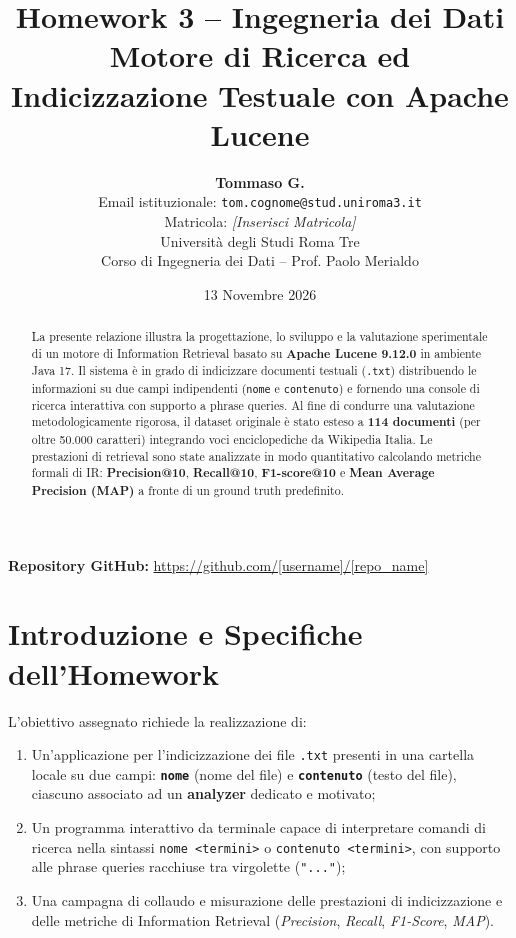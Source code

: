 \documentclass[11pt,a4paper]{article}
\title{\textbf{Homework 3 -- Ingegneria dei Dati} \\ \large Motore di Ricerca ed Indicizzazione Testuale con Apache Lucene}
\author{\textbf{Tommaso G.} \\ 
Email istituzionale: \texttt{tom.cognome@stud.uniroma3.it} \\
Matricola: \textit{[Inserisci Matricola]} \\ 
Università degli Studi Roma Tre \\ 
Corso di Ingegneria dei Dati -- Prof. Paolo Merialdo}
\date{13 Novembre 2026}
\begin{document}
\maketitle

\noindent\textbf{Repository GitHub:} \url{https://github.com/[username]/[repo_name]}

\vspace{0.3cm}

\begin{abstract}
La presente relazione illustra la progettazione, lo sviluppo e la valutazione sperimentale di un motore di Information Retrieval basato su \textbf{Apache Lucene 9.12.0} in ambiente Java 17. Il sistema è in grado di indicizzare documenti testuali (\texttt{.txt}) distribuendo le informazioni su due campi indipendenti (\texttt{nome} e \texttt{contenuto}) e fornendo una console di ricerca interattiva con supporto a phrase queries. Al fine di condurre una valutazione metodologicamente rigorosa, il dataset originale è stato esteso a \textbf{114 documenti} (per oltre 50.000 caratteri) integrando voci enciclopediche da Wikipedia Italia. Le prestazioni di retrieval sono state analizzate in modo quantitativo calcolando metriche formali di IR: \textbf{Precision@10}, \textbf{Recall@10}, \textbf{F1-score@10} e \textbf{Mean Average Precision (MAP)} a fronte di un ground truth predefinito.
\end{abstract}

\vspace{0.4cm}

\section{Introduzione e Specifiche dell'Homework}
L'obiettivo assegnato richiede la realizzazione di:
\begin{enumerate}
    \item Un'applicazione per l'indicizzazione dei file \texttt{.txt} presenti in una cartella locale su due campi: \textbf{\texttt{nome}} (nome del file) e \textbf{\texttt{contenuto}} (testo del file), ciascuno associato ad un \textbf{analyzer} dedicato e motivato;
    \item Un programma interattivo da terminale capace di interpretare comandi di ricerca nella sintassi \texttt{nome <termini>} o \texttt{contenuto <termini>}, con supporto alle phrase queries racchiuse tra virgolette (\texttt{"..."});
    \item Una campagna di collaudo e misurazione delle prestazioni di indicizzazione e delle metriche di Information Retrieval (\textit{Precision}, \textit{Recall}, \textit{F1-Score}, \textit{MAP}).
\end{enumerate}
\end{document}
